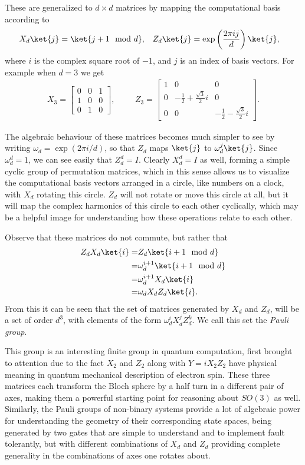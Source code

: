 These are generalized to $d\times d$ matrices by mapping the computational basis according to
\begin{align*}
X_d\ket{j} = \ket{j+1\mod d},
&&&
Z_d\ket{j} = \exp\left(\frac{2\pi ij}{d}\right)\ket{j},
\end{align*} where $i$ is the complex square root of $-1$, and $j$ is an index of basis vectors. For example when $d = 3$ we get
\begin{align*}
X_3 = \begin{bmatrix}
0 & 0 & 1 \\
1 & 0 & 0 \\
0 & 1 & 0
\end{bmatrix},
&&&
Z_3 = \begin{bmatrix}
1 & 0 & 0 \\
0 & -\frac{1}{2} + \frac{\sqrt{3}}{2}i & 0 \\
0 & 0 & -\frac{1}{2} - \frac{\sqrt{3}}{2}i
\end{bmatrix}.
\end{align*}

The algebraic behaviour of these matrices becomes much simpler to see by writing $\omega_d = \exp(2\pi i/d)$, so that $Z_d$ maps $\ket{j}$ to $\omega_d^j\ket{j}$. Since $\omega_d^d = 1$, we can see easily that $Z_d^d = I$. Clearly $X_d^d = I$ as well, forming a simple cyclic group of permutation matrices, which in this sense allows us to visualize the computational basis vectors arranged in a circle, like numbers on a clock, with $X_d$ rotating this circle. $Z_d$ will not rotate or move this circle at all, but it will map the complex harmonics of this circle to each other cyclically, which may be a helpful image for understanding how these operations relate to each other.

Observe that these matrices do not commute, but rather that
\begin{align*}
	Z_dX_d\ket{i}
	=& Z_d\ket{i+1\mod d}
	\\=& \omega_d^{i+1}\ket{i+1\mod d}
	\\=& \omega_d^{i+1}X_d\ket{i}
	\\=& \omega_dX_dZ_d\ket{i}.
\end{align*}
From this it can be seen that the set of matrices generated by $X_d$ and $Z_d$, will be a set of order $d^3$, with elements of the form $\omega_d^iX_d^jZ_d^k$. We call this set the \emph{Pauli group}.

This group is an interesting finite group in quantum computation, first brought to attention due to the fact $X_2$ and $Z_2$ along with $Y = iX_2Z_2$ have physical meaning in quantum mechanical description of electron spin. These three matrices each transform the Bloch sphere by a half turn in a different pair of axes, making them a powerful starting point for reasoning about $SO(3)$ as well. Similarly, the Pauli groups of non-binary systems provide a lot of algebraic power for understanding the geometry of their corresponding state spaces, being generated by two gates that are simple to understand and to implement fault tolerantly, but with different combinations of $X_d$ and $Z_d$ providing complete generality in the combinations of axes one rotates about.

